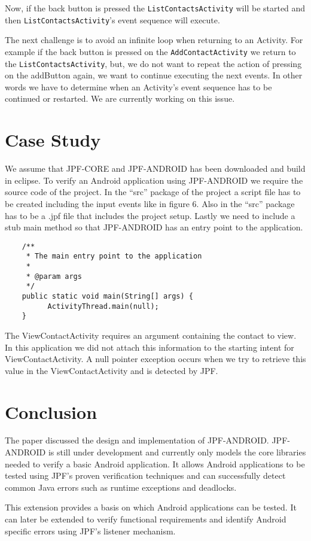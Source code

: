 \documentclass{acm_proc_article-sp}
\begin{document}
Now, if the back button is pressed the \texttt{ListContactsActivity} will be started and then \texttt{ListContactsActivity}'s event sequence
will execute.

The next challenge is to avoid an infinite loop when returning to an Activity. For example if the back button is pressed on the
\texttt{AddContactActivity} we return to the \texttt{ListContactsActivity}, but, we do not want to repeat the action of pressing on the
addButton again, we want to continue executing the next events. In other words we have to determine when an Activity's event sequence has to
be continued or restarted. We are currently working on this issue.

\section{Case Study}
We assume that JPF-CORE and JPF-ANDROID has been downloaded and build in eclipse. To verify an Android application using JPF-ANDROID we
require the source code of the project. In the ``src'' package of the project a script 
file has to be  created including the input events like in figure 6. Also in the ``src'' package has to be a .jpf file that
includes the project setup. Lastly we need to include a stub main method so that JPF-ANDROID has an entry point to the application.

\begin{verbatim}
	/**
	 * The main entry point to the application
	 * 
	 * @param args
	 */
	public static void main(String[] args) {
		  ActivityThread.main(null);
	}
\end{verbatim}

The ViewContactActivity requires an argument containing the contact to view. In this application we did not attach this information to
the starting intent for ViewContactActivity. A null pointer exception occurs when we try to retrieve this value in the ViewContactActivity
and is detected by JPF.

\section{Conclusion}
The paper discussed the design and implementation of JPF-ANDROID. JPF-ANDROID is still under development and currently only models
the core libraries needed to verify a basic Android application. It allows Android applications to be tested using JPF's proven verification
techniques and can successfully detect common Java errors such as runtime exceptions and deadlocks. 

This extension provides a basis on which Android applications can be tested. It can later be extended to verify functional requirements
and identify Android specific errors using JPF's listener mechanism.
\balancecolumns
%

\end{document}

